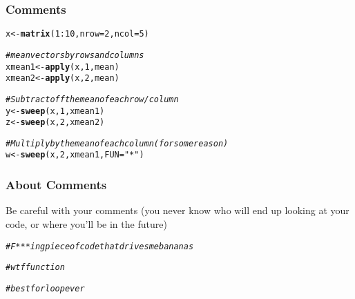 \documentclass[12pt]{beamer}\usepackage[]{graphicx}\usepackage[]{color}
\makeatletter
\newcommand{\hlnum}[1]{\textcolor[rgb]{0.686,0.059,0.569}{#1}}%
\newcommand{\hlstr}[1]{\textcolor[rgb]{0.192,0.494,0.8}{#1}}%
\newcommand{\hlcom}[1]{\textcolor[rgb]{0.678,0.584,0.686}{\textit{#1}}}%
\newcommand{\hlopt}[1]{\textcolor[rgb]{0,0,0}{#1}}%
\newcommand{\hlstd}[1]{\textcolor[rgb]{0.345,0.345,0.345}{#1}}%
\newcommand{\hlkwb}[1]{\textcolor[rgb]{0.69,0.353,0.396}{#1}}%
\newcommand{\hlkwc}[1]{\textcolor[rgb]{0.333,0.667,0.333}{#1}}%
\newcommand{\hlkwd}[1]{\textcolor[rgb]{0.737,0.353,0.396}{\textbf{#1}}}%
\newenvironment{kframe}{%
 \def\at@end@of@kframe{}%
 \ifinner\ifhmode%
  \def\at@end@of@kframe{\end{minipage}}%
  \begin{minipage}{\columnwidth}%
 \fi\fi%
 \def\FrameCommand##1{\hskip\@totalleftmargin \hskip-\fboxsep
 \colorbox{shadecolor}{##1}\hskip-\fboxsep
     \hskip-\linewidth \hskip-\@totalleftmargin \hskip\columnwidth}%
 \MakeFramed {\advance\hsize-\width
   \@totalleftmargin\z@ \linewidth\hsize
   \@setminipage}}%
 {\par\unskip\endMakeFramed%
 \at@end@of@kframe}
\newenvironment{knitrout}{}{} %
\makeatother
\begin{document}

\begin{frame}[fragile]
\frametitle{Comments}

\begin{knitrout}\footnotesize
{}\color{fgcolor}\begin{kframe}
\begin{alltt}
\hlstd{x} \hlkwb{<-} \hlkwd{matrix}\hlstd{(}\hlnum{1}\hlopt{:}\hlnum{10}\hlstd{,} \hlkwc{nrow} \hlstd{=} \hlnum{2}\hlstd{,} \hlkwc{ncol} \hlstd{=} \hlnum{5}\hlstd{)}

\hlcom{# mean vectors by rows and columns}
\hlstd{xmean1} \hlkwb{<-} \hlkwd{apply}\hlstd{(x,} \hlnum{1}\hlstd{, mean)}
\hlstd{xmean2} \hlkwb{<-} \hlkwd{apply}\hlstd{(x,} \hlnum{2}\hlstd{, mean)}

\hlcom{# Subtract off the mean of each row/column}
\hlstd{y} \hlkwb{<-} \hlkwd{sweep}\hlstd{(x,} \hlnum{1}\hlstd{, xmean1)}
\hlstd{z} \hlkwb{<-} \hlkwd{sweep}\hlstd{(x,} \hlnum{2}\hlstd{, xmean2)}

\hlcom{# Multiply by the mean of each column (for some reason)}
\hlstd{w} \hlkwb{<-} \hlkwd{sweep}\hlstd{(x,} \hlnum{2}\hlstd{, xmean1,} \hlkwc{FUN} \hlstd{=} \hlstr{"*"}\hlstd{)}
\end{alltt}
\end{kframe}
\end{knitrout}

\end{frame}


\begin{frame}[fragile]
\frametitle{About Comments}

Be careful with your comments (you never know who will end up looking at your code, or where you'll be in the future)
\begin{knitrout}\footnotesize
{}\color{fgcolor}\begin{kframe}
\begin{alltt}
\hlcom{# F***ing piece of code that drives me bananas}

\hlcom{# wtf function}

\hlcom{# best for loop ever}
\end{alltt}
\end{kframe}
\end{knitrout}

\end{frame}
\end{document}
